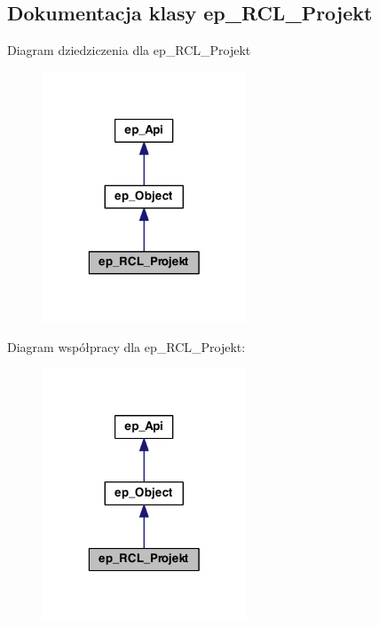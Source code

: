 \hypertarget{classep___r_c_l___projekt}{\subsection{Dokumentacja klasy ep\-\_\-\-R\-C\-L\-\_\-\-Projekt}
\label{classep___r_c_l___projekt}
}


Diagram dziedziczenia dla ep\-\_\-\-R\-C\-L\-\_\-\-Projekt\nopagebreak
\begin{figure}[H]
\begin{center}
\leavevmode
\includegraphics[width=172pt]{classep___r_c_l___projekt__inherit__graph}
\end{center}
\end{figure}


Diagram współpracy dla ep\-\_\-\-R\-C\-L\-\_\-\-Projekt\-:\nopagebreak
\begin{figure}[H]
\begin{center}
\leavevmode
\includegraphics[width=172pt]{classep___r_c_l___projekt__coll__graph}
\end{center}
\end{figure}
